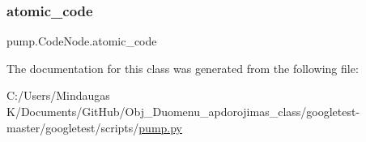 \subsubsection{\texorpdfstring{atomic\_code}{atomic\_code}}
{\footnotesize\ttfamily pump.\+Code\+Node.\+atomic\+\_\+code}



The documentation for this class was generated from the following file\+:\begin{DoxyCompactItemize}
\item 
C\+:/\+Users/\+Mindaugas K/\+Documents/\+Git\+Hub/\+Obj\+\_\+\+Duomenu\+\_\+apdorojimas\+\_\+class/googletest-\/master/googletest/scripts/\mbox{\hyperlink{googletest-master_2googletest_2scripts_2pump_8py}{pump.\+py}}\end{DoxyCompactItemize}
